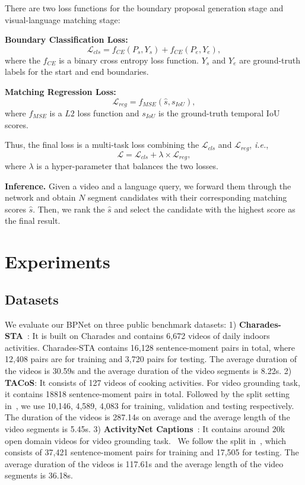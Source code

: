 \documentclass[letterpaper]{article} %
\newcommand{\ie}{\emph{i.e.}}
\begin{document}
There are two loss functions for the boundary proposal generation stage and visual-language matching stage:

\noindent\textbf{Boundary Classification Loss:}
\begin{equation}
\mathcal{L}_{cls} = f_{CE}(P_{s},Y_{s}) + f_{CE}(P_{e},Y_{e}),
\label{equation9}
\end{equation}
where the $f_{CE}$ is a binary cross entropy loss function.
$Y_{s}$ and $Y_{e}$ are ground-truth labels for the start and end boundaries.

\noindent\textbf{Matching Regression Loss:}
\begin{equation}
\mathcal{L}_{reg} = f_{MSE}(\hat{s},s_{IoU}),
\label{equation10}
\end{equation}
where $f_{MSE}$ is a $L2$ loss function and $s_{IoU}$ is the ground-truth temporal IoU scores.

Thus, the final loss is a multi-task loss combining the $\mathcal{L}_{cls}$ and $\mathcal{L}_{reg}$, \ie,
\begin{equation}
\mathcal{L} = \mathcal{L}_{cls} + \lambda \times \mathcal{L}_{reg},
\label{equation11}
\end{equation}
where $\lambda$ is a hyper-parameter that balances the two losses.

\noindent\textbf{Inference.} Given a video and a language query,
we forward them through the network and obtain $N$ segment candidates
with their corresponding matching scores $\hat{s}$. Then, we rank the
$\hat{s}$ and select the candidate with the highest score as the final
result.


\section{Experiments}
\subsection{Datasets}\label{Dataset}
We evaluate our BPNet on three public benchmark datasets: 1) \textbf{Charades-STA}~\cite{DBLP:conf/iccv/GaoSYN17}: It is built on Charades and contains 6,672 videos of daily indoors activities. Charades-STA contains 16,128 sentence-moment pairs in total, where 12,408 pairs are for training and 3,720 pairs for testing. The average duration of the videos is 30.59s and the average duration of the video segments is 8.22s. 2) \textbf{TACoS}: It consists of 127 videos of cooking activities.
For video grounding task, it contains 18818 sentence-moment pairs in total.
Followed by the split setting in~\cite{DBLP:conf/iccv/GaoSYN17}, we use 10,146, 4,589, 4,083
for training, validation and testing respectively.
The duration of the videos is 287.14s on average and the average length of the video segments
is 5.45s. 3) \textbf{ActivityNet Captions}~\cite{DBLP:conf/iccv/KrishnaHRFN17}: It contains around 20k open domain videos for video grounding task. \
We follow the split in~\cite{DBLP:conf/aaai/YuanM019}, which consists of 37,421
sentence-moment pairs for training and 17,505 for testing.
The average duration of the videos is 117.61s and the average length of the video segments
is 36.18s.
\end{document}
